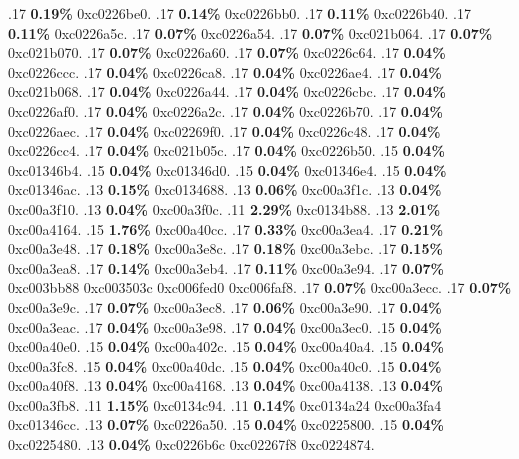 \begin{profile}
{.17 \textbf{0.19\%} 0xc0226be0. 
.17 \textbf{0.14\%} 0xc0226bb0. 
.17 \textbf{0.11\%} 0xc0226b40. 
.17 \textbf{0.11\%} 0xc0226a5c. 
.17 \textbf{0.07\%} 0xc0226a54. 
.17 \textbf{0.07\%} 0xc021b064. 
.17 \textbf{0.07\%} 0xc021b070. 
.17 \textbf{0.07\%} 0xc0226a60. 
.17 \textbf{0.07\%} 0xc0226c64. 
.17 \textbf{0.04\%} 0xc0226ccc. 
.17 \textbf{0.04\%} 0xc0226ca8. 
.17 \textbf{0.04\%} 0xc0226ae4. 
.17 \textbf{0.04\%} 0xc021b068. 
.17 \textbf{0.04\%} 0xc0226a44. 
.17 \textbf{0.04\%} 0xc0226cbc. 
.17 \textbf{0.04\%} 0xc0226af0. 
.17 \textbf{0.04\%} 0xc0226a2c. 
.17 \textbf{0.04\%} 0xc0226b70. 
.17 \textbf{0.04\%} 0xc0226aec. 
.17 \textbf{0.04\%} 0xc02269f0. 
.17 \textbf{0.04\%} 0xc0226c48. 
.17 \textbf{0.04\%} 0xc0226cc4. 
.17 \textbf{0.04\%} 0xc021b05c. 
.17 \textbf{0.04\%} 0xc0226b50. 
.15 \textbf{0.04\%} 0xc01346b4. 
.15 \textbf{0.04\%} 0xc01346d0. 
.15 \textbf{0.04\%} 0xc01346e4. 
.15 \textbf{0.04\%} 0xc01346ac. 
.13 \textbf{0.15\%} 0xc0134688. 
.13 \textbf{0.06\%} 0xc00a3f1c. 
.13 \textbf{0.04\%} 0xc00a3f10. 
.13 \textbf{0.04\%} 0xc00a3f0c. 
.11 \textbf{2.29\%} 0xc0134b88. 
.13 \textbf{2.01\%} 0xc00a4164. 
.15 \textbf{1.76\%} 0xc00a40cc. 
.17 \textbf{0.33\%} 0xc00a3ea4. 
.17 \textbf{0.21\%} 0xc00a3e48. 
.17 \textbf{0.18\%} 0xc00a3e8c. 
.17 \textbf{0.18\%} 0xc00a3ebc. 
.17 \textbf{0.15\%} 0xc00a3ea8. 
.17 \textbf{0.14\%} 0xc00a3eb4. 
.17 \textbf{0.11\%} 0xc00a3e94. 
.17 \textbf{0.07\%} 0xc003bb88\newline {} 0xc003503c\newline {} 0xc006fed0\newline {} 0xc006faf8. 
.17 \textbf{0.07\%} 0xc00a3ecc. 
.17 \textbf{0.07\%} 0xc00a3e9c. 
.17 \textbf{0.07\%} 0xc00a3ec8. 
.17 \textbf{0.06\%} 0xc00a3e90. 
.17 \textbf{0.04\%} 0xc00a3eac. 
.17 \textbf{0.04\%} 0xc00a3e98. 
.17 \textbf{0.04\%} 0xc00a3ec0. 
.15 \textbf{0.04\%} 0xc00a40e0. 
.15 \textbf{0.04\%} 0xc00a402c. 
.15 \textbf{0.04\%} 0xc00a40a4. 
.15 \textbf{0.04\%} 0xc00a3fc8. 
.15 \textbf{0.04\%} 0xc00a40dc. 
.15 \textbf{0.04\%} 0xc00a40c0. 
.15 \textbf{0.04\%} 0xc00a40f8. 
.13 \textbf{0.04\%} 0xc00a4168. 
.13 \textbf{0.04\%} 0xc00a4138. 
.13 \textbf{0.04\%} 0xc00a3fb8. 
.11 \textbf{1.15\%} 0xc0134c94. 
.11 \textbf{0.14\%} 0xc0134a24\newline {} 0xc00a3fa4\newline {} 0xc01346cc. 
.13 \textbf{0.07\%} 0xc0226a50. 
.15 \textbf{0.04\%} 0xc0225800. 
.15 \textbf{0.04\%} 0xc0225480. 
.13 \textbf{0.04\%} 0xc0226b6c\newline {} 0xc02267f8\newline {} 0xc0224874. 
}
\end{profile}
